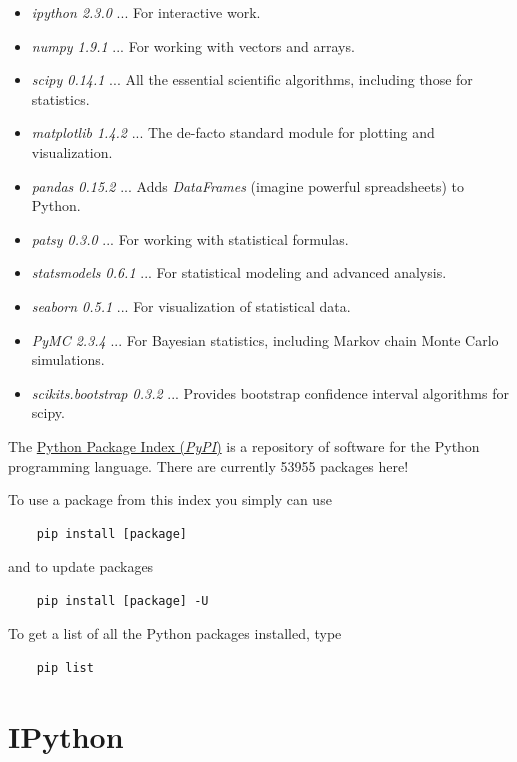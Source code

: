 \begin{itemize}
  \item \emph{ipython 2.3.0} ... For interactive work.
  \item \emph{numpy 1.9.1} ... For working with vectors and arrays.
  \item \emph{scipy 0.14.1} ... All the essential scientific algorithms, including those for statistics.
  \item \emph{matplotlib 1.4.2} ... The de-facto standard module for plotting and visualization.
  \item \emph{pandas 0.15.2} ... Adds \emph{DataFrames} (imagine powerful spreadsheets) to Python.
  \item \emph{patsy 0.3.0} ... For working with statistical formulas.
  \item \emph{statsmodels 0.6.1} ... For statistical modeling and advanced analysis.
  \item \emph{seaborn 0.5.1} ... For visualization of statistical data.
  \item \emph{PyMC 2.3.4} ... For Bayesian statistics, including Markov chain Monte Carlo simulations.
  \item \emph{scikits.bootstrap 0.3.2} ... Provides bootstrap confidence interval algorithms for scipy.
\end{itemize}

The \href{https://pypi.python.org/pypi}{Python Package Index (\emph{PyPI})} is a repository of software for the Python programming language. There are currently 53955 packages here!

To use a package from this index you simply can use

\begin{lstlisting}
    pip install [package]
\end{lstlisting}

and to update packages

\begin{lstlisting}
    pip install [package] -U
\end{lstlisting}

To get a list of all the Python packages installed, type

\begin{lstlisting}
    pip list
\end{lstlisting}


\section{IPython}

